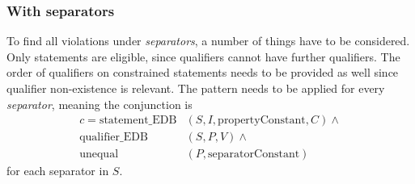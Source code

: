 \documentclass[hyperref,bachelorofscience,fleqn]{cgvpub}
\begin{document}
\subsubsection{With separators}\label{subsubsec_single_value_with_separators}
To find all violations under \emph{separators}, a number of things have to be considered. Only statements are eligible, since qualifiers cannot have further qualifiers. The order of qualifiers on constrained statements needs to be provided as well since qualifier non-existence is relevant. The pattern needs to be applied for every \emph{separator}, meaning the conjunction is
\begin{equation*}
\begin{split}
c = \text{statement\_EDB}&(S, I, \text{propertyConstant}, C) \wedge{} \\
\text{qualifier\_EDB}&(S, P, V) \wedge{} \\
\text{unequal}&(P, \text{separatorConstant})
\end{split}
\end{equation*}
for each separator in \(S\).\\
\end{document}
